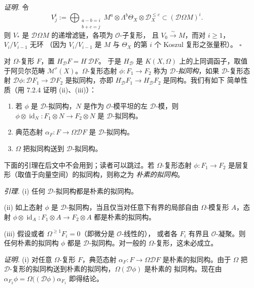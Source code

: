 \emph{证明.} 令
\[
V_j^{i}:=\bigoplus_{\substack{a-b=i\\ b+c=j}}
M^a\otimes\Lambda^b\Theta_X\otimes\mathcal{D}_X^{\leq c}
\subset(\mathcal{D}\Omega M)^i.
\]
则 $V_{*}$ 是 $\mathcal{D}\Omega M$ 的递增滤链，各项为 $\mathcal{O}$-子复形，
且 $V_0\xrightarrow{\sim}M$，而对 $i\ge1$，$V_i/V_{i-1}$ 无环
（因为 $V_i/V_{i-1}$ 是 $M$ 与 $\Theta_X$ 的第 $i$ 个 Koszul 复形之张量积）。
\hfill$\square$

 对 $\Omega$-复形 $F$，置 $H_{\mathcal{D}}^{\cdot}F=H^{\cdot}\mathcal{D}F$。
于是 $H_{\mathcal{D}}$ 是 $K(X,\Omega)$ 上的上同调函子，取值于阿贝尔范畴
$\mathcal{M}^{r}(X)$。$\Omega$-复形态射 $\phi:F_1\to F_2$ 称为
\emph{$\mathcal{D}$-拟同构}，如果 $\mathcal{D}$-复形态射
$\mathcal{D}\phi:\mathcal{D}F_1\to\mathcal{D}F_2$ 是拟同构，亦即
$H_{\mathcal{D}}^{\cdot}F_1\to H_{\mathcal{D}}^{\cdot}F_2$ 是同构。我们有如下
简单性质（用 7.2.4 证明 (ii)、(iii)）：
\begin{enumerate}[label=(\roman*),leftmargin=2.2em]
\item 若 $\phi$ 是 $\mathcal{D}$-拟同构，$N$ 是作为 $\mathcal{O}$-模平坦的左
$\mathcal{D}$-模，则 $\phi\otimes\operatorname{id}_N:F_1\otimes N\to F_2\otimes N$
是 $\mathcal{D}$-拟同构。
\item 典范态射 $\alpha_F:F\to\Omega\mathcal{D}F$ 是 $\mathcal{D}$-拟同构。
\item $\Omega$ 把拟同构送到 $\mathcal{D}$-拟同构。
\end{enumerate}

下面的引理在后文中不会用到；读者可以跳过。若 $\Omega$-复形态射
$\phi:F_1\to F_2$ 是层复形（取值于向量空间）的拟同构，则称之为
\emph{朴素的拟同构}。


 \emph{引理.} (i) 任何 $\mathcal{D}$-拟同构都是朴素的拟同构。

(ii) 如上态射 $\phi$ 是 $\mathcal{D}$-拟同构，当且仅当对任意下有界的局部自由
$\Omega$-模复形 $A$，态射 $\phi\otimes\operatorname{id}_A:F_1\otimes A\to F_2\otimes A$
都是朴素的拟同构。

(iii) 假设或者 $\Omega^{\ge1}F_i^{\cdot}=0$（即微分是 $\mathcal{O}$-线性的），
或者各 $F_i^{\cdot}$ 有界且 $\mathcal{O}$-凝聚。则任何朴素的拟同构 $\phi$ 都是
$\mathcal{D}$-拟同构。对一般的 $\Omega$-复形，这未必成立。

\emph{证明.} (i) 对任意 $\Omega$-复形 $F$，典范态射
$\alpha_F:F\to\Omega\mathcal{D}F$ 是朴素的拟同构。由于 $\Omega$ 把
$\mathcal{D}$-复形的拟同构送到朴素的拟同构，$\Omega(\mathcal{D}\phi)$ 是朴素的
拟同构。现在由 $\alpha_{F_2}\phi=\Omega((\mathcal{D}\phi)\alpha_{F_1}$ 即得结论。

